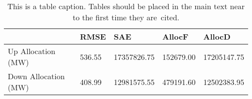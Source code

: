 \begin{table}[H] 
    \caption{This is a table caption. Tables should be placed in the main text near to the first time they are~cited.\label{tab1}}
    \begin{tabularx}{\textwidth}{CCCCC}
    \toprule
    & \textbf{RMSE}	& \textbf{SAE}	& \textbf{AllocF} & \textbf{AllocD}\\
    \midrule
    Up Allocation (MW) & 536.55 & 17357826.75 & 152679.00 & 17205147.75 \\
    Down Allocation (MW) & 408.99 & 12981575.55 & 479191.60 & 12502383.95 \\
        \bottomrule
    \end{tabularx}
\end{table}

